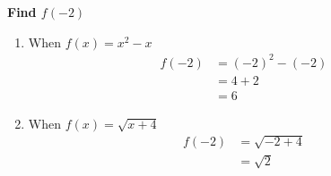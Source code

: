 \documentclass[crop=false,fleqn]{standalone}
\begin{document}
    \textbf{Find $f(-2)$}

    \begin{enumerate}
        \item When $f(x) = x^2 - x$
        \begin{align*}
            f(-2) &= (-2)^2 - (-2) \\
                &= 4+2 \\
                &= 6
        \end{align*}

        \item When $f(x) = \sqrt{x + 4}$
        \begin{align*}
            f(-2) &= \sqrt{-2 + 4} \\
                &= \sqrt{2}
        \end{align*}
    \end{enumerate}
\end{document}
